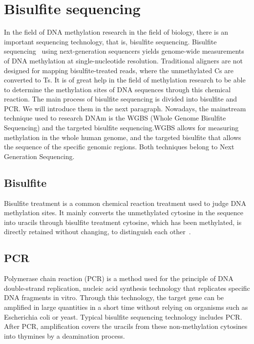 \documentclass{PHlab-thesis}
\begin{document}
\section{Bisulfite sequencing}
In the field of DNA methylation research in the field of biology, there is an important sequencing technology, that is, bisulfite sequencing. Bisulfite sequencing~\cite{darst2010bisulfite} using next-generation sequencers yields genome-wide measurements of DNA methylation at single-nucleotide resolution. Traditional aligners are not designed for mapping bisulfite-treated reads, where the unmethylated Cs are converted to Ts. It is of great help in the field of methylation research to be able to determine the methylation sites of DNA sequences through this chemical reaction. The main process of bisulfite sequencing is divided into bisulfite and PCR. We will introduce them in the next paragraph. Nowadays, the mainstream technique used to research DNAm is the WGBS (Whole Genome Bisulfite Sequencing) and the targeted bisulfite sequencing.WGBS allows for measuring methylation in the whole human genome, and the targeted bisulfite that allows the sequence of the specific genomic regions. Both techniques belong to Next Generation Sequencing.
\subsection{Bisulfite}
Bisulfite treatment is a common chemical reaction treatment used to judge DNA methylation sites. It mainly converts the unmethylated cytosine in the sequence into uracils through bisulfite treatment cytosine, which has been methylated, is directly retained without changing, to distinguish each other~\cite{krueger2011bismark}.
\subsection{PCR}
Polymerase chain reaction (PCR) is a method used for the principle of DNA double-strand replication, nucleic acid synthesis technology that replicates specific DNA fragments in vitro. Through this technology, the target gene can be amplified in large quantities in a short time without relying on organisms such as Escherichia coli or yeast. Typical bisulfite sequencing technology includes PCR. After PCR, amplification covers the uracils from these non-methylation cytosines into thymines by a deamination process.
\end{document}
